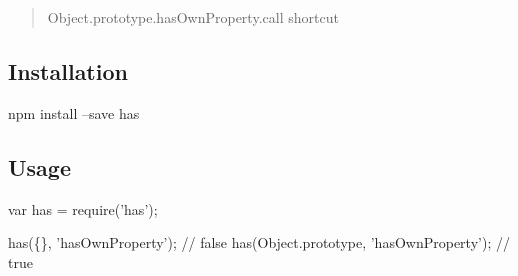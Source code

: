 \begin{quote}
Object.\+prototype.\+has\+Own\+Property.\+call shortcut \end{quote}


\subsection*{Installation}


\begin{DoxyCode}
npm install --save has
\end{DoxyCode}


\subsection*{Usage}


\begin{DoxyCode}
var has = require('has');

has(\{\}, 'hasOwnProperty'); // false
has(Object.prototype, 'hasOwnProperty'); // true
\end{DoxyCode}
 